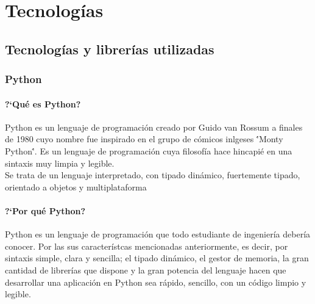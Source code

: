 %
%
\chapter{Tecnolog\'ias}



\section{Tecnolog\'ias y librer\'ias utilizadas}
\subsection{Python}
\subsubsection{?`Qu\'e es Python?}
Python es un lenguaje de programaci\'on creado por Guido van Rossum a finales de 1980 cuyo nombre fue inspirado en el grupo de c\'omicos inlgeses \''Monty Python\''. Es un lenguaje de programaci\'on cuya filosof\'ia hace hincapi\'e en una sintaxis muy limpia y legible.\\

Se trata de un lenguaje interpretado, con tipado din\'amico, fuertemente tipado, orientado a objetos y multiplataforma

\subsubsection{?`Por qu\'e Python?}
Python es un lenguaje de programaci\'on que todo estudiante de ingenier\'ia deber\'ia conocer. Por las sus caracter\'istcas mencionadas anteriormente, es decir, por sintaxis simple, clara y sencilla; el tipado din\'amico, el gestor de memoria, la gran cantidad de librerías que dispone y la gran potencia del lenguaje hacen que desarrollar una aplicaci\'on en Python sea rápido, sencillo, con un c\'odigo limpio y legible.\\

